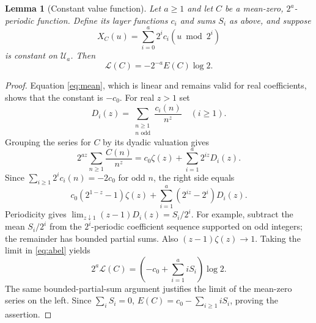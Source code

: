 \documentclass[11pt,a4paper]{article}
\newtheorem{lemma}[theorem]{Lemma}
\theoremstyle{definition}\newtheorem{definition}[theorem]{Definition}
\theoremstyle{remark}\newtheorem{remark}[theorem]{Remark}
\newcommand{\LL}{\mathcal L}\newcommand{\UU}{\mathcal U}
\begin{document}
\begin{lemma}[Constant value function]\label{lem:cancellation}
Let $a\ge1$ and let $C$ be a mean-zero, $2^a$-periodic function. Define its layer
functions $c_i$ and sums $S_i$ as above, and suppose
\[
 X_C(u)=\sum_{i=0}^a2^i c_i(u\bmod2^i)
\]
is constant on $\UU_a$. Then
\begin{equation}\label{eq:cancellation}
 \LL(C)=-2^{-a}E(C)\log2.
\end{equation}
\end{lemma}
\begin{proof}
Equation \eqref{eq:mean}, which is linear and remains valid for real
coefficients, shows that the constant is $-c_0$. For real $z>1$ set
\[
 D_i(z)=\sum_{\substack{n\ge1\\n\text{ odd}}}\frac{c_i(n)}{n^z}
 \quad(i\ge1).
\]
Grouping the series for $C$ by its dyadic valuation gives
\[
 2^{az}\sum_{n\ge1}\frac{C(n)}{n^z}
 =c_0\zeta(z)+\sum_{i=1}^a2^{iz}D_i(z).
\]
Since $\sum_{i\ge1}2^i c_i(n)=-2c_0$ for odd $n$, the right side
equals
\begin{equation}\label{eq:abel}
 c_0(2^{1-z}-1)\zeta(z)
   +\sum_{i=1}^a(2^{iz}-2^i)D_i(z).
\end{equation}
Periodicity gives $\lim_{z\downarrow1}(z-1)D_i(z)=S_i/2^i$.
For example, subtract the mean $S_i/2^i$ from the $2^i$-periodic
coefficient sequence supported on odd integers; the remainder has
bounded partial sums. Also $(z-1)\zeta(z)\to1$. Taking the limit in
\eqref{eq:abel} yields
\[
 2^a\LL(C)=\left(-c_0+\sum_{i=1}^a iS_i\right)\log2.
\]
The same bounded-partial-sum argument justifies the limit of the
mean-zero series on the left. Since $\sum_iS_i=0$,
$E(C)=c_0-\sum_{i\ge1}iS_i$, proving the assertion.
\end{proof}
\end{document}
